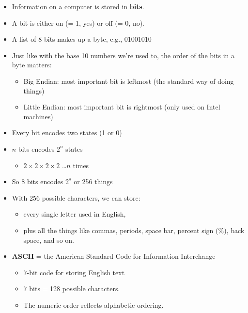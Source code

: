 \documentclass[a4paper,landscape,headrule,footrule,xetex]{foils}
\begin{document}
\begin{itemize}
\item Information on a computer is stored in \textbf{bits}.
\item A bit is either on (= 1, yes) or off (= 0, no).
\item A list of 8 bits makes up a byte, e.g., 01001010
\item Just like with the base 10 numbers we're used to, the order of the bits in a byte matters:
  \begin{itemize}
  \item Big Endian: most important bit is leftmost (the standard way of doing things)
  \item Little Endian: most important bit is rightmost (only used on Intel machines)
  \end{itemize}
\end{itemize}


\begin{itemize}
\item Every bit encodes two states (1 or 0)
\item $n$ bits encodes $2^n$ states
  \begin{itemize}
  \item $2 \times 2 \times 2 \times 2$ \ldots $n$ times
  \end{itemize}
\item So 8 bits encodes $2^8$ or 256 things
\end{itemize}








\begin{itemize}
\item  With 256 possible characters, we can store:
  \begin{itemize}
  \item every single letter used in English,
  \item plus all the things like commas, periods, space bar, percent sign (\%), back space, and so on.
  \end{itemize}
\item \textbf{ASCII} = the American Standard Code for Information Interchange
  \begin{itemize}
  \item  7-bit code for storing English text
  \item 7 bits = 128 possible characters.
  \item The numeric order reflects alphabetic ordering.
  \end{itemize}
\end{itemize}
\end{document}
